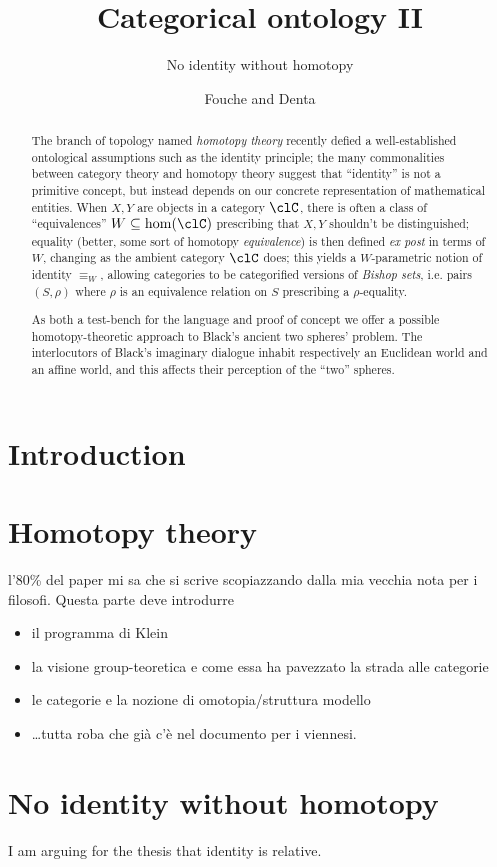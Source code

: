 \documentclass{amsart}
\author{Fouche and Denta}
\title{Categorical ontology II}
\subtitle{No identity without homotopy}
\begin{document}
\maketitle
\begin{abstract}
  The branch of topology named \emph{homotopy theory} recently defied a well\hyp{}established ontological assumptions such as the identity principle; the many commonalities between category theory and homotopy theory suggest that ``identity'' is not a primitive concept, but instead depends on our concrete representation of mathematical entities. When $X,Y$ are objects in a category $\clC$, there is often a class of ``equivalences'' $W \subseteq \hom(\clC)$ prescribing that $X,Y$ shouldn't be distinguished; equality (better, some sort of homotopy \emph{equivalence}) is then defined \emph{ex post} in terms of $W$, changing as the ambient category $\clC$ does; this yields a $W$-parametric notion of identity $\equiv_W$, allowing categories to be categorified versions of \emph{Bishop sets}, i.e. pairs $(S,\rho)$ where $\rho$ is an equivalence relation on $S$ prescribing a $\rho$-equality.

  As both a test-bench for the language and proof of concept we offer a possible homotopy-theoretic approach to Black's ancient two spheres' problem. The interlocutors of Black's imaginary dialogue inhabit respectively an Euclidean world and an affine world, and this affects their perception of the ``two'' spheres.
\end{abstract}
\section{Introduction}
\section{Homotopy theory}
l'80\% del paper mi sa che si scrive scopiazzando dalla mia vecchia nota per i filosofi. Questa parte deve introdurre
\begin{itemize}
  \item il programma di Klein 
  \item la visione group-teoretica e come essa ha pavezzato la strada alle categorie
  \item le categorie e la nozione di omotopia/struttura modello
  \item \dots tutta roba che già c'è nel documento per i viennesi.
\end{itemize}
\section{No identity without homotopy}
\epigraph{I am arguing for the thesis that identity is relative.}{\cite{}}
\end{document}
